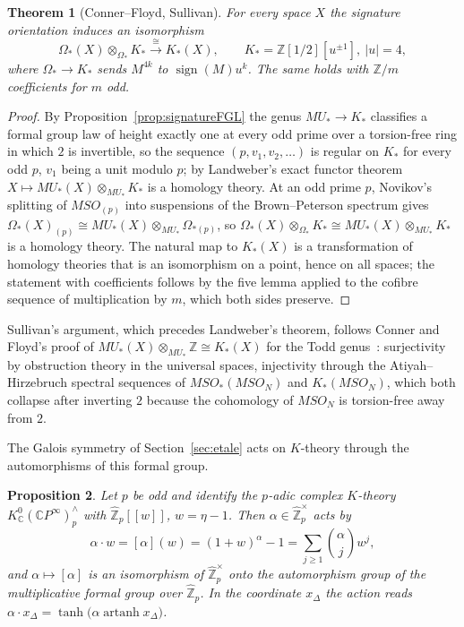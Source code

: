 \documentclass[11pt]{amsart}
\theoremstyle{plain}
\newtheorem{theorem}{Theorem}[section]
\newtheorem{proposition}[theorem]{Proposition}
\theoremstyle{definition}
\numberwithin{equation}{section}
\newcommand{\Z}{\mathbb{Z}}
\newcommand{\C}{\mathbb{C}}
\newcommand{\Zhat}{\widehat{\mathbb{Z}}}
\newcommand{\CP}{\mathbb{C}P}
\newcommand{\units}{^{\times}}
\DeclareMathOperator{\sign}{sign}
\begin{document}
\begin{theorem}[Conner--Floyd, Sullivan]\label{thm:ConnerFloyd}
For every space $X$ the signature orientation induces an isomorphism
\[
\Omega_*(X)\otimes_{\Omega_*}K_*\xrightarrow{\ \cong\ }K_*(X),\qquad K_*=\Z[1/2][u^{\pm1}],\ |u|=4,
\]
where $\Omega_*\to K_*$ sends $M^{4k}$ to $\sign(M)u^k$.
The same holds with $\Z/m$ coefficients for $m$ odd.
\end{theorem}

\begin{proof}
By Proposition~\ref{prop:signatureFGL} the genus $MU_*\to K_*$ classifies a formal group law of height exactly one at every odd prime over a torsion-free ring in which $2$ is invertible, so the sequence $(p,v_1,v_2,\dots)$ is regular on $K_*$ for every odd $p$, $v_1$ being a unit modulo $p$; by Landweber's exact functor theorem~\cite{Landweber} $X\mapsto MU_*(X)\otimes_{MU_*}K_*$ is a homology theory.
At an odd prime $p$, Novikov's splitting of $MSO_{(p)}$ into suspensions of the Brown--Peterson spectrum gives $\Omega_*(X)_{(p)}\cong MU_*(X)\otimes_{MU_*}\Omega_{*(p)}$, so $\Omega_*(X)\otimes_{\Omega_*}K_*\cong MU_*(X)\otimes_{MU_*}K_*$ is a homology theory.
The natural map to $K_*(X)$ is a transformation of homology theories that is an isomorphism on a point, hence on all spaces; the statement with coefficients follows by the five lemma applied to the cofibre sequence of multiplication by $m$, which both sides preserve.
\end{proof}

Sullivan's argument, which precedes Landweber's theorem, follows Conner and Floyd's proof of $MU_*(X)\otimes_{MU_*}\Z\cong K_*(X)$ for the Todd genus~\cite{ConnerFloyd}: surjectivity by obstruction theory in the universal spaces, injectivity through the Atiyah--Hirzebruch spectral sequences of $MSO_*(MSO_N)$ and $K_*(MSO_N)$, which both collapse after inverting $2$ because the cohomology of $MSO_N$ is torsion-free away from $2$.

The Galois symmetry of Section~\ref{sec:etale} acts on $K$-theory through the automorphisms of this formal group.

\begin{proposition}\label{prop:galoisFGL}
Let $p$ be odd and identify the $p$-adic complex $K$-theory $K_{\C}^0(\CP^\infty)^\wedge_p$ with $\Zhat_p[[w]]$, $w=\eta-1$.
Then $\alpha\in\Zhat_p\units$ acts by
\[
\alpha\cdot w=[\alpha](w)=(1+w)^\alpha-1=\sum_{j\ge1}\binom{\alpha}{j}w^j,
\]
and $\alpha\mapsto[\alpha]$ is an isomorphism of $\Zhat_p\units$ onto the automorphism group of the multiplicative formal group over $\Zhat_p$.
In the coordinate $x_\Delta$ the action reads $\alpha\cdot x_\Delta=\tanh\bigl(\alpha\operatorname{artanh}x_\Delta\bigr)$.
\end{proposition}
\end{document}
